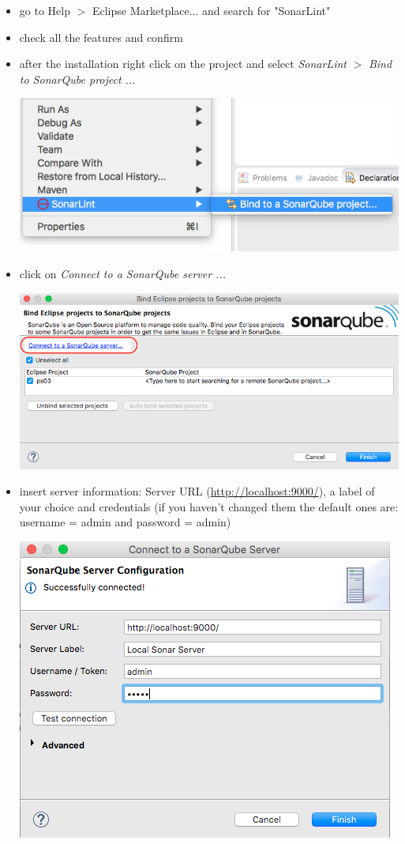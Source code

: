 \documentclass{article}
\begin{document}
\begin{itemize}
\item go to Help $>$ Eclipse Marketplace... and search for "SonarLint"
\item check all the features and confirm
\item after the installation right click on the project and select \textit{ SonarLint} $ > $ \textit{Bind to SonarQube project ...}
\begin{center}
	\includegraphics[scale=0.5]{figures/ss6}
\end{center}
\item click on \textit{Connect to a SonarQube server ...}
\begin{center}
	\includegraphics[scale=0.5]{figures/ss7}
\end{center}
\item insert server information: Server URL  (\url{http://localhost:9000/}), a label of your choice and credentials (if you haven't changed them the default ones are: username = admin and password = admin)
\begin{center}
	\includegraphics[scale=0.5]{figures/ss8}
\end{center}


\end{itemize}
\end{document}
